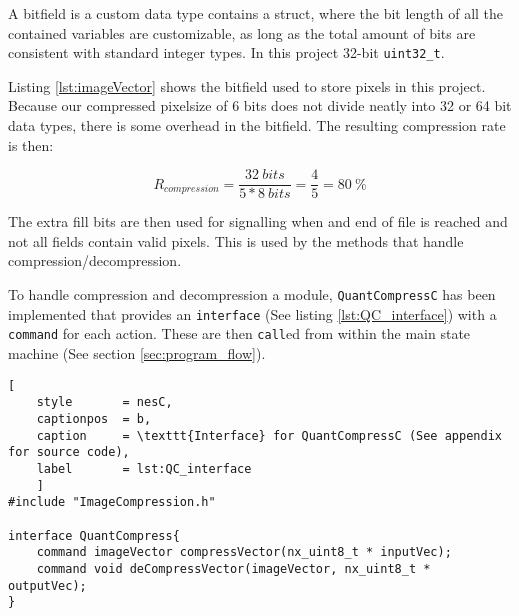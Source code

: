 A bitfield is a custom data type contains a struct, where the bit length of all the contained variables are customizable, as long as the total amount of bits are consistent with standard integer types.
In this project 32-bit \texttt{uint32\_t}.

Listing \ref{lst:imageVector} shows the bitfield used to store pixels in this project.
Because our compressed pixelsize of 6 bits does not divide neatly into 32 or 64 bit data types, there is some overhead in the bitfield.
The resulting compression rate is then:

\begin{equation}
R_{compression} = 
\dfrac{32\ bits}
{5 * 8\ bits} =
\dfrac{4}{5} = 
80\ \%
\end{equation}

The extra fill bits are then used for signalling when and end of file is reached and not all fields contain valid pixels.
This is used by the methods that handle compression/decompression. 

To handle compression and decompression a module, \texttt{QuantCompressC} has been implemented that provides an \texttt{interface} (See listing \ref{lst:QC_interface}) with a \texttt{command} for each action.
These are then \texttt{call}ed from within the main state machine (See section \ref{sec:program_flow}).

\begin{lstlisting}[
	style		= nesC, 
	captionpos	= b, 
	caption		= \texttt{Interface} for QuantCompressC (See appendix for source code),
	label		= lst:QC_interface
	]
#include "ImageCompression.h"

interface QuantCompress{
	command imageVector compressVector(nx_uint8_t * inputVec);
	command void deCompressVector(imageVector, nx_uint8_t * outputVec);
}
\end{lstlisting}